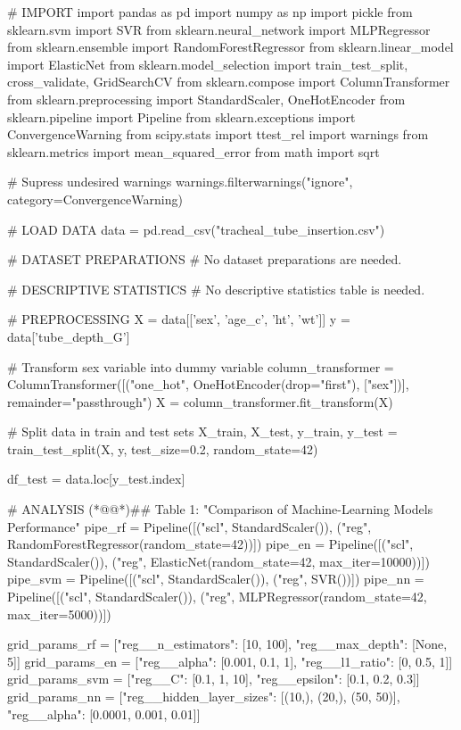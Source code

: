 \documentclass[11pt]{article}
\begin{document}
\begin{python}

# IMPORT
import pandas as pd
import numpy as np
import pickle
from sklearn.svm import SVR
from sklearn.neural_network import MLPRegressor
from sklearn.ensemble import RandomForestRegressor
from sklearn.linear_model import ElasticNet
from sklearn.model_selection import train_test_split, cross_validate, GridSearchCV
from sklearn.compose import ColumnTransformer
from sklearn.preprocessing import StandardScaler, OneHotEncoder
from sklearn.pipeline import Pipeline
from sklearn.exceptions import ConvergenceWarning
from scipy.stats import ttest_rel
import warnings
from sklearn.metrics import mean_squared_error
from math import sqrt

# Supress undesired warnings
warnings.filterwarnings("ignore", category=ConvergenceWarning)

# LOAD DATA
data = pd.read_csv("tracheal_tube_insertion.csv")

# DATASET PREPARATIONS
# No dataset preparations are needed.

# DESCRIPTIVE STATISTICS
# No descriptive statistics table is needed.

# PREPROCESSING 
X = data[['sex', 'age_c', 'ht', 'wt']]
y = data['tube_depth_G']

# Transform sex variable into dummy variable
column_transformer = ColumnTransformer([("one_hot", OneHotEncoder(drop="first"), ["sex"])], remainder="passthrough")
X = column_transformer.fit_transform(X)

# Split data in train and test sets
X_train, X_test, y_train, y_test = train_test_split(X, y, test_size=0.2, random_state=42)

df_test = data.loc[y_test.index]

# ANALYSIS 
(*@@*)## Table 1: "Comparison of Machine-Learning Models Performance"
pipe_rf = Pipeline([("scl", StandardScaler()), ("reg", RandomForestRegressor(random_state=42))])
pipe_en = Pipeline([("scl", StandardScaler()), ("reg", ElasticNet(random_state=42, max_iter=10000))])
pipe_svm = Pipeline([("scl", StandardScaler()), ("reg", SVR())])
pipe_nn = Pipeline([("scl", StandardScaler()), ("reg", MLPRegressor(random_state=42, max_iter=5000))])

grid_params_rf = [{"reg__n_estimators": [10, 100], "reg__max_depth": [None, 5]}]
grid_params_en = [{"reg__alpha": [0.001, 0.1, 1], "reg__l1_ratio": [0, 0.5, 1]}]
grid_params_svm = [{"reg__C": [0.1, 1, 10], "reg__epsilon": [0.1, 0.2, 0.3]}]
grid_params_nn = [{"reg__hidden_layer_sizes": [(10,), (20,), (50, 50)], "reg__alpha": [0.0001, 0.001, 0.01]}]


\end{python}
\end{document}

